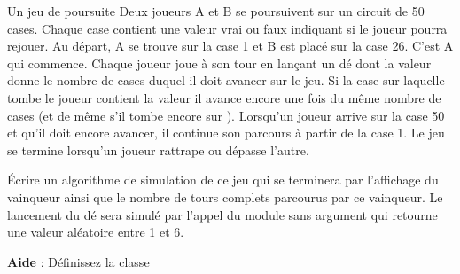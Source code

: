 \begin{Exercice}{Un jeu de poursuite}
	Deux joueurs A et B se poursuivent sur un
	circuit de 50 cases. Chaque case contient une valeur vrai ou faux
	indiquant si le joueur pourra rejouer.
	Au départ, A se trouve sur la case 1 et B est placé sur la case 26.
	C’est A qui commence. Chaque joueur joue à son tour en lançant un dé
	dont la valeur donne le nombre de cases duquel il doit avancer sur le
	jeu. Si la case sur laquelle tombe le joueur contient la valeur
	 il avance encore
	une fois du même nombre de cases (et de même s’il tombe encore sur
	). Lorsqu’un joueur
	arrive sur la case 50 et qu’il doit encore avancer, il continue son
	parcours à partir de la case 1. Le jeu se termine lorsqu’un joueur
	rattrape ou dépasse l’autre.

	Écrire un algorithme de simulation de ce jeu
	qui se terminera par l’affichage du vainqueur ainsi que le nombre de
	tours complets parcourus par ce vainqueur. 
	Le lancement du dé sera simulé par l’appel du module sans argument
	 qui retourne
	une valeur aléatoire entre 1 et 6.

	\textbf{Aide} :	Définissez la classe
	

\end{Exercice}
